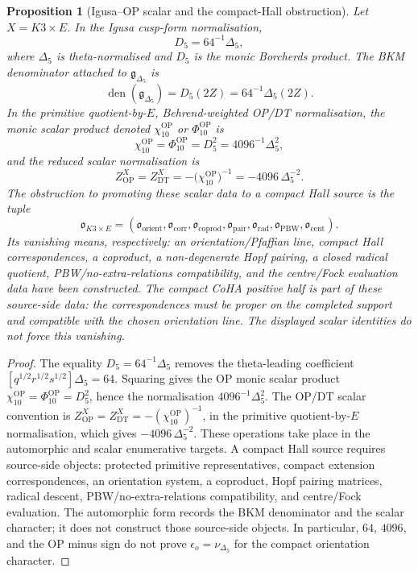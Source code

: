 \documentclass[11pt]{amsart}
\newtheorem{proposition}[theorem]{Proposition}
\theoremstyle{definition}
\theoremstyle{remark}
\begin{document}
\begin{proposition}[Igusa--OP scalar and the compact-Hall obstruction]
Let \(X=K3\times E\). In the Igusa cusp-form normalisation,
\[
        D_5=64^{-1}\Delta_5 ,
\]
where \(\Delta_5\) is theta-normalised and \(D_5\) is the monic Borcherds
product. The BKM denominator attached to \(\mathfrak g_{\Delta_5}\) is
\[
        \operatorname{den}(\mathfrak g_{\Delta_5})
        =D_5(2Z)=64^{-1}\Delta_5(2Z).
\]
In the primitive quotient-by-\(E\), Behrend-weighted OP/DT normalisation, the
monic scalar product denoted \(\chi_{10}^{\mathrm{OP}}\) or
\(\Phi_{10}^{\mathrm{OP}}\) is
\[
        \chi_{10}^{\mathrm{OP}}
        =\Phi_{10}^{\mathrm{OP}}
        =D_5^2
        =4096^{-1}\Delta_5^2,
\]
and the reduced scalar normalisation is
\[
        Z^{X}_{\mathrm{OP}}
        =Z^{X}_{\mathrm{DT}}
        =-\bigl(\chi_{10}^{\mathrm{OP}}\bigr)^{-1}
        =-4096\,\Delta_5^{-2}.
\]
The obstruction to promoting these scalar data to a compact Hall source is
the tuple
\[
        \mathfrak{o}_{K3\times E}
        =(\mathfrak{o}_{\mathrm{orient}},
          \mathfrak{o}_{\mathrm{corr}},
          \mathfrak{o}_{\mathrm{coprod}},
          \mathfrak{o}_{\mathrm{pair}},
          \mathfrak{o}_{\mathrm{rad}},
          \mathfrak{o}_{\mathrm{PBW}},
          \mathfrak{o}_{\mathrm{cent}}).
\]
Its vanishing means, respectively: an orientation/Pfaffian line, compact
Hall correspondences, a coproduct, a non-degenerate Hopf pairing, a closed
radical quotient, PBW/no-extra-relations compatibility, and the centre/Fock
evaluation data have been constructed. The compact CoHA positive half is
part of these source-side data: the correspondences must be proper on the
completed support and compatible with the chosen orientation line. The
displayed scalar identities do not force this vanishing.
\end{proposition}

\begin{proof}
The equality \(D_5=64^{-1}\Delta_5\) removes the theta-leading coefficient
\([q^{1/2}r^{1/2}s^{1/2}]\Delta_5=64\). Squaring gives the OP monic scalar
product
\(\chi_{10}^{\mathrm{OP}}=\Phi_{10}^{\mathrm{OP}}=D_5^2\), hence the
normalisation \(4096^{-1}\Delta_5^2\). The OP/DT scalar convention is
\(Z^{X}_{\mathrm{OP}}=Z^{X}_{\mathrm{DT}}
=-(\chi_{10}^{\mathrm{OP}})^{-1}\), in the primitive quotient-by-\(E\)
normalisation, which gives
\(-4096\,\Delta_5^{-2}\). These operations take place in the automorphic
and scalar enumerative targets. A compact Hall source requires source-side
objects: protected primitive representatives, compact extension
correspondences, an orientation system, a coproduct, Hopf pairing matrices,
radical descent, PBW/no-extra-relations compatibility, and centre/Fock
evaluation. The automorphic form records the BKM denominator and the scalar
character; it does not construct those source-side objects. In
particular, \(64\), \(4096\), and the OP minus sign do not prove
\(\epsilon_o=\nu_{\Delta_5}\) for the compact orientation character.
\end{proof}
\end{document}

